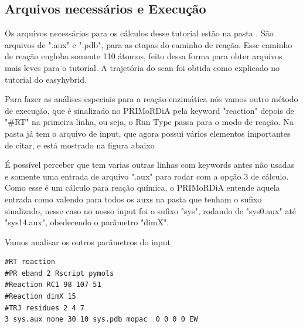 \documentclass[a4paper,11pt]{refart}
\begin{document}
\subsection{Arquivos necessários e Execução}

Os arquivos necessários para os cálculos desse tutorial estão na pasta . São arquivos de ".aux" e ".pdb", para as etapas do caminho de reação. Esse caminho de reação engloba somente 110 átomos, feito dessa forma para obter arquivos mais leves para o tutorial. A trajetória do scan foi obtida como explicado no tutorial do easyhybrid.

Para fazer as análises especiais para a reação enzimática nós vamos outro método de execução, que é sinalizado no PRIMoRDiA pela keyword "reaction" depois de "\#RT" na primeira linha, ou seja, o Run Type passa para o modo de reação. Na pasta já tem o arquivo de input, que agora possui vários elementos importantes de citar, e está mostrado na figura abaixo

É possível perceber que tem varias outras linhas com keywords antes não usadas e somente uma entrada de arquivo ".aux" para rodar com a opção 3 de cálculo. Como esse é um cálculo para reação química, o PRIMoRDiA entende aquela entrada como valendo para todos os auxs na pasta que tenham o sufixo sinalizado, nesse caso no nosso input foi o sufixo "sys", rodando de "sys0.aux" até "sys14.aux", obedecendo o parâmetro "dimX".

Vamos analisar os outros parâmetros do input

\hspace*{-\leftmarginwidth}
\begin{minipage}{\fullwidth}
\begin{lstlisting}[caption={Input editado para execução do tutorial 3},label={tut402}]
#RT reaction 
#PR eband 2 Rscript pymols
#Reaction RC1 98 107 51
#Reaction dimX 15
#TRJ residues 2 4 7
3 sys.aux none 30 10 sys.pdb mopac  0 0 0 0 EW
\end{lstlisting}
\end{minipage}
\end{document}
